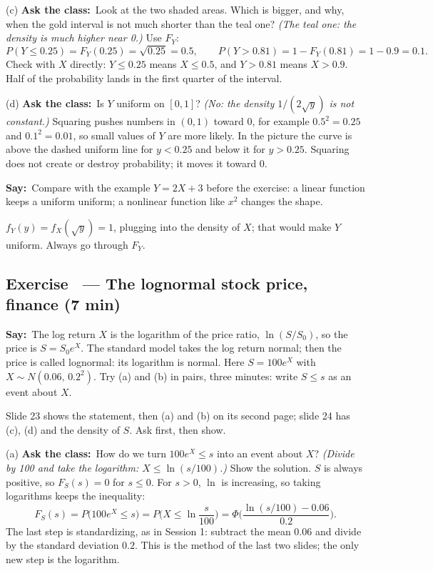 \documentclass[11pt,a4paper,parskip=half]{scrartcl}
\renewcommand{\needspace}[1]{\Needspace{6\baselineskip}}
\newcommand{\say}{\textbf{\color{teal}Say:}\ }
\newcommand{\ask}{\textbf{\color{navy}Ask the class:}\ }
\begin{document}
(c) \ask Look at the two shaded areas. Which is bigger, and why, when the
gold interval is not much shorter than the teal one? \emph{(The teal one:
the density is much higher near 0.)} Use $F_Y$:
\[ P(Y\le0.25)=F_Y(0.25)=\sqrt{0.25}=0.5,\qquad
	P(Y>0.81)=1-F_Y(0.81)=1-0.9=0.1. \]
Check with $X$ directly: $Y\le0.25$ means $X\le0.5$, and $Y>0.81$ means
$X>0.9$. Half of the probability lands in the first quarter of the
interval.

(d) \ask Is $Y$ uniform on $[0,1]$? \emph{(No: the density $1/(2\sqrt y)$
is not constant.)} Squaring pushes numbers in $(0,1)$ toward 0, for
example $0.5^2=0.25$ and $0.1^2=0.01$, so small values of $Y$ are more
likely. In the picture the curve is above the dashed uniform line for
$y<0.25$ and below it for $y>0.25$. Squaring does not create or destroy
probability; it moves it toward 0.

\say Compare with the example $Y=2X+3$ before the exercise: a linear function keeps a uniform
uniform; a nonlinear function like $x^2$ changes the shape.

\begin{mistake}
	$f_Y(y)=f_X(\sqrt y)=1$, plugging into the density of $X$; that would
	make $Y$ uniform. Always go through $F_Y$.
\end{mistake}

\needspace{0.25\textheight}
\subsection{Exercise~ --- The lognormal stock price, finance (7 min)}


\say The log return $X$ is the logarithm of the price ratio, $\ln(S/S_0)$,
so the price is $S=S_0e^X$. The standard model takes the log return
normal; then the price is called lognormal: its logarithm is normal. Here
$S=100e^X$ with $X\sim N(0.06,\,0.2^2)$. Try (a) and (b) in pairs, three
minutes: write $S\le s$ as an event about $X$.

\begin{slidecue}
	Slide 23 shows the statement, then (a) and (b) on its second page;
	slide 24 has (c), (d) and the density of $S$. Ask first, then show.
\end{slidecue}

(a) \ask How do we turn $100e^X\le s$ into an event about $X$?
\emph{(Divide by 100 and take the logarithm: $X\le\ln(s/100)$.)} Show
the solution. $S$ is always positive, so $F_S(s)=0$ for $s\le0$. For
$s>0$, $\ln$ is increasing, so taking logarithms keeps the inequality:
\[ F_S(s)=P\big(100e^X\le s\big)=P\Big(X\le\ln\frac{s}{100}\Big)
	=\Phi\Big(\frac{\ln(s/100)-0.06}{0.2}\Big). \]
The last step is standardizing, as in Session 1: subtract the mean $0.06$
and divide by the standard deviation $0.2$. This is the method of the last
two slides; the only new step is the logarithm.
\end{document}
